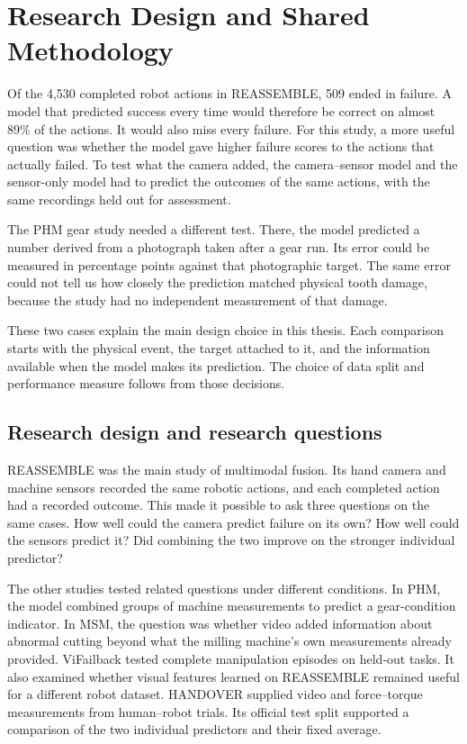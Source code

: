 \chapter{Research Design and Shared Methodology}
\label{ch:methodology}

Of the 4,530 completed robot actions in REASSEMBLE, 509 ended in failure. A model that
predicted success every time would therefore be correct on almost 89\% of the actions.
It would also miss every failure. For this study, a more useful question was whether the
model gave higher failure scores to the actions that actually failed. To test what the
camera added, the camera–sensor model and the sensor-only model had to predict the
outcomes of the same actions, with the same recordings held out for assessment.

The PHM gear study needed a different test. There, the model predicted a number derived
from a photograph taken after a gear run. Its error could be measured in percentage
points against that photographic target. The same error could not tell us how closely
the prediction matched physical tooth damage, because the study had no independent
measurement of that damage.

These two cases explain the main design choice in this thesis. Each comparison starts
with the physical event, the target attached to it, and the information available when
the model makes its prediction. The choice of data split and performance measure follows
from those decisions.

\section{Research design and research questions}
\label{sec:ch4-design}

REASSEMBLE was the main study of multimodal fusion. Its hand camera and machine sensors
recorded the same robotic actions, and each completed action had a recorded outcome.
This made it possible to ask three questions on the same cases. How well could the
camera predict failure on its own? How well could the sensors predict it? Did combining
the two improve on the stronger individual predictor?

The other studies tested related questions under different conditions. In PHM, the model
combined groups of machine measurements to predict a gear-condition indicator. In MSM,
the question was whether video added information about abnormal cutting beyond what the
milling machine’s own measurements already provided. ViFailback tested complete
manipulation episodes on held-out tasks. It also examined whether visual features
learned on REASSEMBLE remained useful for a different robot dataset. HANDOVER supplied
video and force–torque measurements from human–robot trials. Its official test split
supported a comparison of the two individual predictors and their fixed average.

